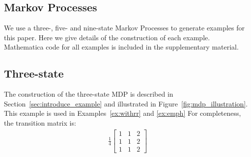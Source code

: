 \subsection{Markov Processes}\label{sec:all_mdps}

We use a three-, five- and nine-state Markov Processes to generate examples for this paper. Here we give details of the construction of each example. Mathematica code for all examples is included in the supplementary material.

\subsection{Three-state}
The construction of the three-state MDP is described in Section~\ref{sec:introduce_example} and illustrated in Figure~\ref{fig:mdp_illustration}. This example is used in Examples~\ref{ex:withrr} and \ref{ex:emph} For completeness, the transition matrix is:
\begin{align}
  \frac{1}{4}\begin{bmatrix}
               1 & 1 & 2 \\ 1 & 1 & 2 \\ 1 & 1 & 2
             \end{bmatrix}
\end{align}

